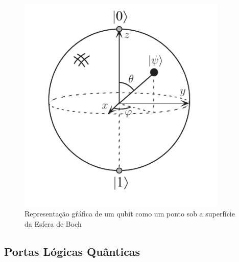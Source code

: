 \documentclass[11pt,oneside,brazil,hidelinks,article,sumario=tradicional,a4paper]{abntex2}
\begin{document}
\begin{figure}[ht!]
\centering
\caption{Representação gŕáfica de um qubit como um ponto sob a superfície da Esfera de Boch}\label{boch}
\includegraphics[width=10cm]{boch.png}
\end{figure}


\subsection{Portas Lógicas Quânticas}
\end{document}
